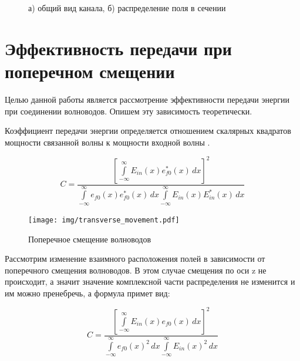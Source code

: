 \begin{figure}[h]
	\begin{minipage}[h]{0.49\linewidth}
	\end{minipage}
	\hfill
	\begin{minipage}[h]{0.49\linewidth}
	\end{minipage}
	\caption{а) общий вид канала, б) распределение поля в сечении}
	\label{polozok}
\end{figure}

\section{Эффективность передачи при поперечном смещении}

Целью данной работы является рассмотрение эффективности передачи энергии при соединении волноводов. Опишем эту зависимость теоретически.

Коэффициент передачи энергии определяется отношением скалярных квадратов мощности связанной волны к мощности входной волны \cite{lefevre}.

\begin{equation}
	\label{coupling_full}
	C = \frac{\left[\int\limits_{-\infty}^{\infty}E_{in}(x)e_{f0}^*(x) \,dx\right]^2}
	{\int\limits_{-\infty}^{\infty}e_{f0}(x)e_{f0}^*(x) \,dx
	 \int\limits_{-\infty}^{\infty}E_{in}(x)E_{in}^*(x) \,dx}
\end{equation}

\begin{figure}[h!]
	\texttt{[image: img/transverse\_movement.pdf]}
	\caption{Поперечное смещение волноводов}
	\label{transverse_movement}
\end{figure}

Рассмотрим изменение взаимного расположения полей в зависимости от поперечного смещения волноводов. В этом случае смещения по оси z не происходит, а значит значение комплексной части распределения не изменится и им можно пренебречь, а формула примет вид:

\begin{equation}
	\label{coupling_natural}
	C = \frac{\left[\int\limits_{-\infty}^{\infty}E_{in}(x)e_{f0}(x) \,dx\right]^2}
	{\int\limits_{-\infty}^{\infty}e_{f0}(x)^2 \,dx
	 \int\limits_{-\infty}^{\infty}E_{in}(x)^2 \,dx}
\end{equation}

